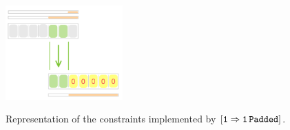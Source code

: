 \begin{figure}[h!]
\centering
\includegraphics[width = 0.4\textwidth]{drawing/1_to_1_padded}
\label{fig: one partial to one padded}
\caption{Representation of the constraints implemented by $\operatorname{\mathtt{[1\Rightarrow1\,Padded]}}$.}
\end{figure}